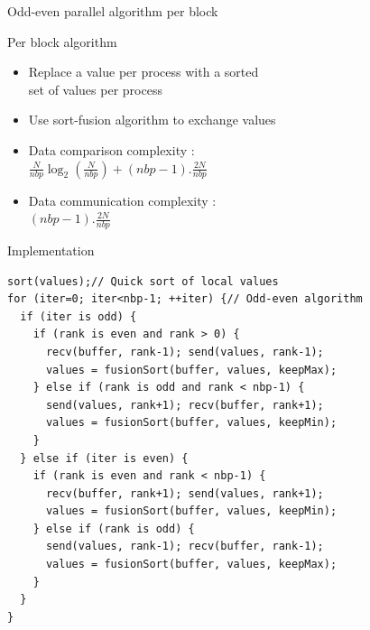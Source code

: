 \documentclass[compress,10pt,aspectratio=169]{beamer}
\begin{document}
\begin{frame}[fragile]{Odd-even parallel algorithm per block}
  \scriptsize
  \begin{multicols}{2}
  \begin{block}{\small Per block algorithm}
    \begin{itemize}
    \item Replace a value per process with a sorted \\
          set of values per process
    \item Use sort-fusion algorithm to exchange values
    \item Data comparison complexity : \\
      $
      \frac{N}{nbp}\log_{2}\left(\frac{N}{nbp}\right) +
      (nbp-1).\frac{2N}{nbp}
      $
    \item Data communication complexity : \\
      $
      (nbp-1).\frac{2N}{nbp}
      $
    \end{itemize}
  \end{block}

  \begin{exampleblock}{\small Implementation}
    \begin{verbatim}
sort(values);// Quick sort of local values
for (iter=0; iter<nbp-1; ++iter) {// Odd-even algorithm
  if (iter is odd) {
    if (rank is even and rank > 0) {
      recv(buffer, rank-1); send(values, rank-1);
      values = fusionSort(buffer, values, keepMax);
    } else if (rank is odd and rank < nbp-1) {
      send(values, rank+1); recv(buffer, rank+1);
      values = fusionSort(buffer, values, keepMin);
    }
  } else if (iter is even) {
    if (rank is even and rank < nbp-1) {
      recv(buffer, rank+1); send(values, rank+1);
      values = fusionSort(buffer, values, keepMin);
    } else if (rank is odd) {
      send(values, rank-1); recv(buffer, rank-1);
      values = fusionSort(buffer, values, keepMax);
    }
  }
}
    \end{verbatim}
  \end{exampleblock}
  \end{multicols}
\end{frame}
\end{document}
